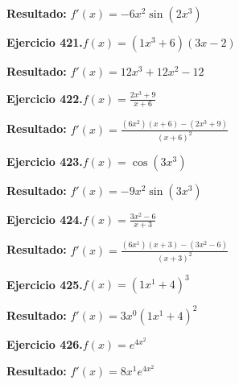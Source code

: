 \documentclass[10pt,a4paper]{article}
\begin{document}
\begin{solbox}
\textbf{Resultado:} \(\displaystyle f'(x) = -6x^{2}\sin(2x^{3})\)
\end{solbox}

\newpage
\begin{ejbox}
\textbf{Ejercicio 421.}\quad $f(x) = (1x^{3} +6)(3x -2)$
\end{ejbox}

\begin{solbox}
\textbf{Resultado:} \(\displaystyle f'(x) = 12x^{3} +12x^{2} -12\)
\end{solbox}

\begin{ejbox}
\textbf{Ejercicio 422.}\quad $f(x) = \frac{2x^{3} +9}{x + 6}$
\end{ejbox}

\begin{solbox}
\textbf{Resultado:} \(\displaystyle f'(x) = \frac{(6x^{2})(x+6) - (2x^{3} +9)}{(x+6)^2}\)
\end{solbox}

\begin{ejbox}
\textbf{Ejercicio 423.}\quad $f(x) = \cos(3x^{3})$
\end{ejbox}

\begin{solbox}
\textbf{Resultado:} \(\displaystyle f'(x) = -9x^{2}\sin(3x^{3})\)
\end{solbox}

\newpage
\begin{ejbox}
\textbf{Ejercicio 424.}\quad $f(x) = \frac{3x^{2} -6}{x + 3}$
\end{ejbox}

\begin{solbox}
\textbf{Resultado:} \(\displaystyle f'(x) = \frac{(6x^{1})(x+3) - (3x^{2} -6)}{(x+3)^2}\)
\end{solbox}

\begin{ejbox}
\textbf{Ejercicio 425.}\quad $f(x) = (1x^{1} +4)^{3}$
\end{ejbox}

\begin{solbox}
\textbf{Resultado:} \(\displaystyle f'(x) = 3x^{0}(1x^{1} +4)^{2}\)
\end{solbox}

\begin{ejbox}
\textbf{Ejercicio 426.}\quad $f(x) = e^{4x^{2}}$
\end{ejbox}

\begin{solbox}
\textbf{Resultado:} \(\displaystyle f'(x) = 8x^{1}e^{4x^{2}}\)
\end{solbox}
\end{document}
